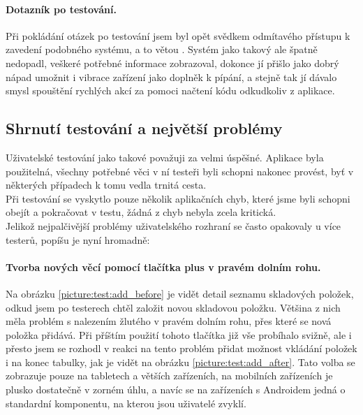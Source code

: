 \paragraph{Dotazník po testování.} Při pokládání otázek po testování jsem byl opět svědkem odmítavého přístupu k zavedení podobného systému, a to větou . Systém jako takový ale špatně nedopadl, veškeré potřebné informace zobrazoval, dokonce jí přišlo jako dobrý nápad umožnit i vibrace zařízení jako doplněk k pípání, a stejně tak jí dávalo smysl spouštění rychlých akcí za pomoci načtení kódu odkudkoliv z aplikace.


\subsection{Shrnutí testování a největší problémy}

Uživatelské testování jako takové považuji za velmi úspěšné. Aplikace byla použitelná, všechny potřebné věci v ní testeři byli schopni nakonec provést, byť v některých případech k tomu vedla trnitá cesta.\\
Při testování se vyskytlo pouze několik aplikačních chyb, které jsme byli schopni obejít a pokračovat v testu, žádná z chyb nebyla zcela kritická.\\

Jelikož nejpalčivější problémy uživatelského rozhraní se často opakovaly u více testerů, popíšu je nyní hromadně:

\paragraph{Tvorba nových věcí pomocí tlačítka plus v pravém dolním rohu.} Na obrázku \ref{picture:test:add_before} je vidět detail seznamu skladových položek, odkud jsem po testerech chtěl založit novou skladovou položku. Většina z nich měla problém s nalezením žlutého  v pravém dolním rohu, přes které se nová položka přidává. Při příštím použití tohoto tlačítka již vše probíhalo svižně, ale i přesto jsem se rozhodl v reakci na tento problém přidat možnost vkládání položek i na konec tabulky, jak je vidět na obrázku \ref{picture:test:add_after}. Tato volba se zobrazuje pouze na tabletech a větších zařízeních, na mobilních zařízeních je plusko dostatečně v zorném úhlu, a navíc se na zařízeních s Androidem jedná o standardní komponentu, na kterou jsou uživatelé zvyklí.

